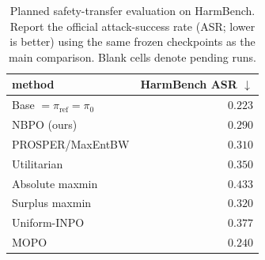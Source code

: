 \documentclass{article}
\theoremstyle{remark}
\theoremstyle{plain}
\newcommand{\piref}{\pi_{\mathrm{ref}}}
\newcommand{\NBPO}{\textsc{NBPO}}
\begin{document}
\begin{table}[t]
\centering\footnotesize
\setlength{\tabcolsep}{4.0pt}
\caption{Planned safety-transfer evaluation on HarmBench. Report the official attack-success rate (ASR; lower is better) using the same frozen checkpoints as the main comparison. Blank cells denote pending runs.}
\label{tab:safety-transfer}
\begin{tabular}{lr}
\toprule
method & HarmBench ASR $\downarrow$ \\
\midrule
Base $=\piref=\pi_0$ & $\mathbf{0.223}$ \\
\NBPO{} (ours) & $0.290$ \\
PROSPER/MaxEntBW & $0.310$ \\
Utilitarian & $0.350$ \\
Absolute maxmin & $0.433$ \\
Surplus maxmin & $0.320$ \\
Uniform-INPO & $0.377$ \\
MOPO & $0.240$ \\
\bottomrule
\end{tabular}
\end{table}
\end{document}

